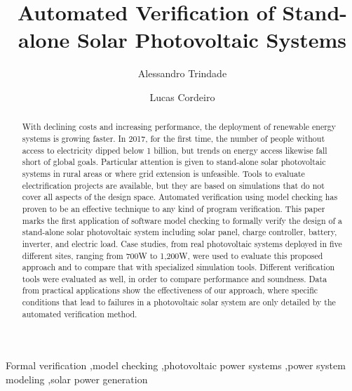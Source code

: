 \documentclass[review]{elsarticle}
\begin{document}
\begin{frontmatter}

\title{Automated Verification of Stand-alone Solar Photovoltaic Systems}


\author[mymainaddress]{Alessandro Trindade}

\author[mysecondaryaddress]{Lucas Cordeiro}


\address[mymainaddress]{Federal University of Amazonas, Av. Rodrigo Octávio, 6200, Coroado I, 69077-000 Manaus-AM-Brazil}
\address[mysecondaryaddress]{University of Manchester, School of Computer Science, Kilburn Building, Manchester M13 9PL}

\begin{abstract}
With declining costs and increasing performance, the deployment of renewable energy systems is growing faster. In 2017, for the first time, the number of people without access to electricity dipped below 1 billion, but trends on energy access likewise fall short of global goals. Particular attention is given to stand-alone solar photovoltaic systems in rural areas or where grid extension is unfeasible. Tools to evaluate electrification projects are available, but they are based on simulations that do not cover all aspects of the design space. Automated verification using model checking has proven to be an effective technique to any kind of program verification. This paper marks the first application of software model checking to formally verify the design of a stand-alone solar photovoltaic system including solar panel, charge controller, battery, inverter, and electric load. Case studies, from real photovoltaic systems deployed in five different sites, ranging from 700W to 1,200W, were used to evaluate this proposed approach and to compare that with specialized simulation tools. Different verification tools were evaluated as well, in order to compare performance and soundness. Data from practical applications show the effectiveness of our approach, where specific conditions that lead to failures in a photovoltaic solar system are only detailed by the automated verification method.
\end{abstract}

\begin{keyword}
Formal verification \sep model checking \sep photovoltaic power systems \sep power system modeling \sep solar power generation
\end{keyword}

\end{frontmatter}
\end{document}
